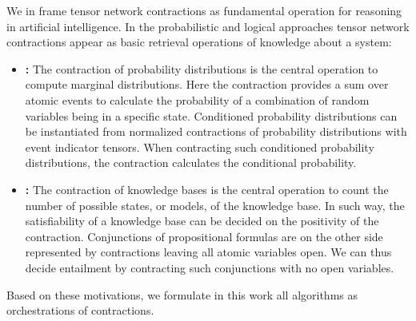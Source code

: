 We in  frame tensor network contractions as fundamental operation for reasoning in artificial intelligence.
In the probabilistic and logical approaches tensor network contractions appear as basic retrieval operations of knowledge about a system:
\begin{itemize}
    \item \textbf{\ProbabilityTheory{}:}
    The contraction of probability distributions is the central operation to compute marginal distributions.
    Here the contraction provides a sum over atomic events to calculate the probability of a combination of random variables being in a specific state.
    Conditioned probability distributions can be instantiated from normalized contractions of probability distributions with event indicator tensors.
    When contracting such conditioned probability distributions, the contraction calculates the conditional probability.
    \item \textbf{\PropositionalLogic{}:}
    The contraction of knowledge bases is the central operation to count the number of possible states, or models, of the knowledge base.
    In such way, the satisfiability of a knowledge base can be decided on the positivity of the contraction.
    Conjunctions of propositional formulas are on the other side represented by contractions leaving all atomic variables open.
    We can thus decide entailment by contracting such conjunctions with no open variables.
\end{itemize}
Based on these motivations, we formulate in this work all algorithms as orchestrations of contractions.


